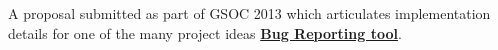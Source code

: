 \documentclass[]{deedy-resume-openfont}
\begin{document}
\begin{minipage}[t]{0.66\textwidth}
\descript{}
\begin{tightemize}
\item A proposal submitted as part of GSOC 2013 which articulates implementation
  details for one of the many project ideas
  \href{http://swlogs.me/blog/gsoc-2013/}{\textbf{Bug Reporting tool}}.
\end{tightemize}
\sectionsep
%


\end{minipage}
\end{document}
